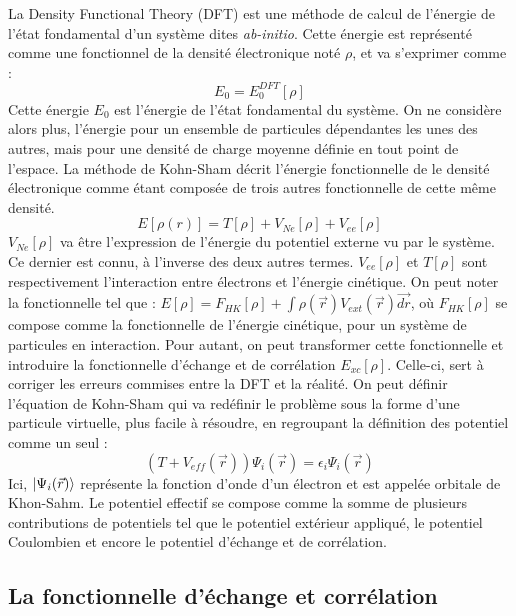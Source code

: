 \documentclass[oneside,finale,10pt]{report}
\begin{document}
\hspace*{20px}La Density Functional Theory (DFT) est une méthode de calcul de l'énergie de l'état fondamental d'un système dites \textit{ab-initio}. Cette énergie est représenté comme une  fonctionnel de la densité électronique noté $ \rho $, et va s'exprimer comme :
\begin{equation*}
E_0 = E_0^{DFT}[\rho]
\end{equation*} 
Cette énergie $ E_0 $ est l'énergie de l'état fondamental du système. On ne considère alors plus, l'énergie pour un ensemble de particules dépendantes les unes des autres, mais pour une densité de charge moyenne définie en tout point de l'espace. 
\newline
La méthode de Kohn-Sham décrit l'énergie fonctionnelle de le densité électronique comme étant composée de trois autres fonctionnelle de cette même densité.
\begin{equation*}
E[\rho(r)] = T[\rho] + V_{Ne}[\rho] + V_{ee}[\rho]
\end{equation*}
$V_{Ne}[\rho]$ va être l'expression de l'énergie du potentiel externe vu par le système. Ce dernier est connu, à l'inverse des deux autres termes. $V_{ee}[\rho]$ et $ T[\rho] $ sont respectivement l’interaction entre électrons et l'énergie cinétique.
On peut noter la fonctionnelle tel que : $ E[\rho] = F_{HK}[\rho] + \int \rho(\vec{r}) V_{ext}(\vec{r}) \vec{dr} $, où $ F_{HK}[\rho] $ se compose comme la fonctionnelle de l'énergie cinétique, pour un système de particules en interaction. Pour autant, on peut transformer cette fonctionnelle et introduire la fonctionnelle d'échange et de corrélation $ E_{xc}[\rho] $. Celle-ci, sert à corriger les erreurs commises entre la DFT et la réalité.
On peut définir l'équation de Kohn-Sham qui va redéfinir le problème sous la forme d'une particule virtuelle, plus facile à résoudre, en regroupant la définition des potentiel comme un seul :
\begin{equation*}
(T + V_{eff}(\vec{r}))\Psi_i(\vec{r}) = \epsilon_i\Psi_i(\vec{r})
\end{equation*}
Ici, $ \ket{\Psi_i(\vec{r})} $ représente la fonction d'onde d'un électron et est appelée orbitale de Khon-Sahm. Le potentiel effectif se compose comme la somme de plusieurs contributions de potentiels tel que le potentiel extérieur appliqué, le potentiel Coulombien et encore le potentiel d'échange et de corrélation.

\subsection{La fonctionnelle d'échange et corrélation}
\end{document}
